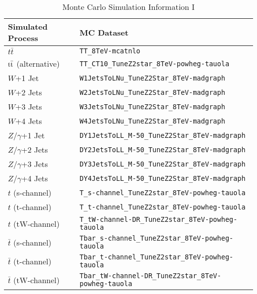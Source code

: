 \begin{table}[h!]
\small
\caption{\small Monte Carlo Simulation Information I}
\centering
\begin{tabular}{| p{2.55 cm} |  p{10 cm} |}
\hline
\textbf{Simulated Process} & \textbf{MC Dataset} \\[0.5ex]
\hline
$\displaystyle{t\bar{t}}$                    & \texttt{TT\_8TeV-mcatnlo}               \\
$\mathrm{t}\bar{\mathrm{t}}$ (alternative)  & \texttt{TT\_CT10\_TuneZ2star\_8TeV-powheg-tauola } \\
$\displaystyle{W}$+1 Jet                & \texttt{W1JetsToLNu\_TuneZ2Star\_8TeV-madgraph}               \\
$\displaystyle{W}$+2 Jets               & \texttt{W2JetsToLNu\_TuneZ2Star\_8TeV-madgraph}               \\
$\displaystyle{W}$+3 Jets               & \texttt{W3JetsToLNu\_TuneZ2Star\_8TeV-madgraph}                \\
$\displaystyle{W}$+4 Jets               & \texttt{W4JetsToLNu\_TuneZ2Star\_8TeV-madgraph}                \\
$\displaystyle{Z/\gamma}$+1 Jet         & \texttt{DY1JetsToLL\_M-50\_TuneZ2Star\_8TeV-madgraph}          \\
$\displaystyle{Z/\gamma}$+2 Jets        & \texttt{DY2JetsToLL\_M-50\_TuneZ2Star\_8TeV-madgraph}         \\
$\displaystyle{Z/\gamma}$+3 Jets        & \texttt{DY3JetsToLL\_M-50\_TuneZ2Star\_8TeV-madgraph}         \\
$\displaystyle{Z/\gamma}$+4 Jets        & \texttt{DY4JetsToLL\_M-50\_TuneZ2Star\_8TeV-madgraph}          \\
$\displaystyle{t}$ (s-channel)          & \texttt{T\_s-channel\_TuneZ2star\_8TeV-powheg-tauola}          \\
$\displaystyle{t}$ (t-channel)          & \texttt{T\_t-channel\_TuneZ2star\_8TeV-powheg-tauola}         \\
$\displaystyle{t}$ (tW-channel)         & \texttt{T\_tW-channel-DR\_TuneZ2star\_8TeV-powheg-tauola}       \\
$\displaystyle{\bar{t}}$ (s-channel)    & \texttt{Tbar\_s-channel\_TuneZ2star\_8TeV-powheg-tauola}       \\
$\displaystyle{\bar{t}}$ (t-channel)    & \texttt{Tbar\_t-channel\_TuneZ2star\_8TeV-powheg-tauola}        \\
$\displaystyle{\bar{t}}$ (tW-channel)   & \texttt{Tbar\_tW-channel-DR\_TuneZ2star\_8TeV-powheg-tauola}    \\
\hline
\end{tabular}
\label{tab:sim_samples}
\end{table}

